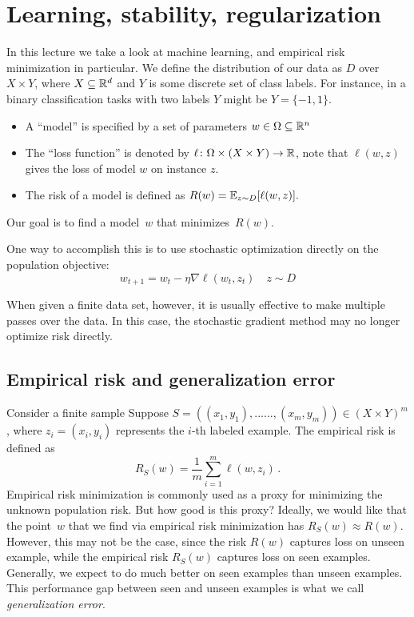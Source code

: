 \section{Learning, stability, regularization}

In this lecture we take a look at machine learning, and empirical risk
minimization in particular. We define the distribution of our data as $D$ over
$X\times Y$, where $X\subseteq \mathbb{R}^{d}$ and $Y$ is some discrete set of class
labels. For instance, in a binary classification tasks with two labels $Y$ 
might be $ Y = \{ -1,1 \}$.
\begin{itemize}
\item A ``model'' is specified by a set of parameters $w \in
\Omega\subseteq\mathbb{R}^n$
\item The ``loss function'' is denoted by $\ell\colon \Omega \times (X\times Y)
\rightarrow \mathbb{R}$, note that $\ell(w,z)$ gives the loss of model $w$ on instance
$z.$
\item The risk of a model is defined as $R(w)=\operatorname*{\mathbb{E}}_{z\sim D}[\ell(w,z)].$
\end{itemize}
Our goal is to find a model~$w$ that minimizes~$R(w).$

One way to accomplish this is to use stochastic optimization directly on the
population objective:
$$w_{t+1} = w_{t} - \eta \nabla \ell(w_t,z_t) \quad z\sim D$$

When given a finite data set, however, it is usually effective to make multiple
passes over the data. In this case, the stochastic gradient method may no longer
optimize risk directly.
%
\subsection{Empirical risk and generalization error}

Consider a finite sample Suppose $S=((x_1,y_1),......,(x_m,y_m))\in(X\times
Y)^m$, where $z_i=(x_i,y_i)$ represents the $i$-th labeled example.
The empirical risk is defined as
\[
R_{S}(w) = \frac{1}{m}\sum_{i=1}^{m}\ell(w,z_i)\,.
\]
Empirical risk minimization is commonly used as a proxy for minimizing the
unknown population risk. But how good is this proxy? Ideally, we would like that
the point~$w$ that we find via empirical risk minimization has $R_S(w)\approx
R(w).$ However, this may not be the case, since the risk $R(w)$ captures loss on
unseen example, while the empirical risk $R_S(w)$ captures loss on seen
examples. Generally, we expect to do much better on seen examples than unseen
examples. This performance gap between seen and unseen examples is what we call
\emph{generalization error}.

